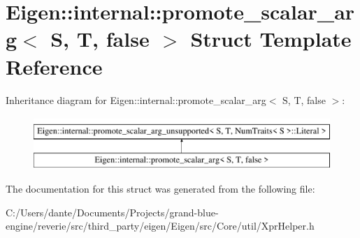 \hypertarget{struct_eigen_1_1internal_1_1promote__scalar__arg_3_01_s_00_01_t_00_01false_01_4}{}\section{Eigen\+::internal\+::promote\+\_\+scalar\+\_\+arg$<$ S, T, false $>$ Struct Template Reference}
\label{struct_eigen_1_1internal_1_1promote__scalar__arg_3_01_s_00_01_t_00_01false_01_4}
Inheritance diagram for Eigen\+::internal\+::promote\+\_\+scalar\+\_\+arg$<$ S, T, false $>$\+:\begin{figure}[H]
\begin{center}
\leavevmode
\includegraphics[height=2.000000cm]{struct_eigen_1_1internal_1_1promote__scalar__arg_3_01_s_00_01_t_00_01false_01_4}
\end{center}
\end{figure}


The documentation for this struct was generated from the following file\+:\begin{DoxyCompactItemize}
\item 
C\+:/\+Users/dante/\+Documents/\+Projects/grand-\/blue-\/engine/reverie/src/third\+\_\+party/eigen/\+Eigen/src/\+Core/util/Xpr\+Helper.\+h\end{DoxyCompactItemize}

